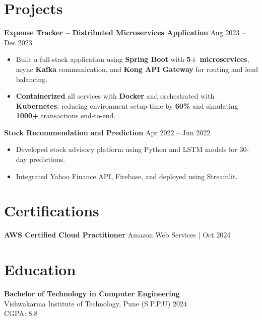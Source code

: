 \documentclass[a4paper,10pt]{article}
\begin{document}
\section*{Projects}

\textbf{Expense Tracker -- Distributed Microservices Application} \hfill Aug 2023 -- Dec 2023
\begin{itemize}[leftmargin=*]
    \item Built a full-stack application using \textbf{Spring Boot} with \textbf{5+ microservices}, async \textbf{Kafka} communication, and \textbf{Kong API Gateway} for routing and load balancing.
    \item \textbf{Containerized} all services with \textbf{Docker} and orchestrated with \textbf{Kubernetes}, reducing environment setup time by \textbf{60\%} and simulating \textbf{1000+} transactions end-to-end.
\end{itemize}
\textbf{Stock Recommendation and Prediction} \hfill Apr 2022 -- Jun 2022
\begin{itemize}[leftmargin=*]
    \item Developed stock advisory platform using Python and LSTM models for 30-day predictions.
    \item Integrated Yahoo Finance API, Firebase, and deployed using Streamlit.
\end{itemize}

\section*{Certifications}
\textbf{AWS Certified Cloud Practitioner} \hfill Amazon Web Services \;|\; Oct 2024 \\

\section*{Education}

\textbf{Bachelor of Technology in Computer Engineering} \\
Vishwakarma Institute of Technology, Pune (S.P.P.U) \hfill 2024 \\
CGPA: 8.8
\end{document}
